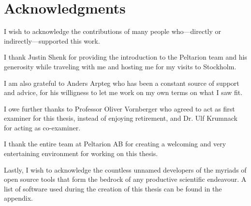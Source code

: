 \chapter*{Acknowledgments}

I wish to acknowledge the contributions of many people who---directly or
indirectly---supported this work.

I thank Justin Shenk for providing the introduction to the Peltarion team and his generosity while traveling with me and
hosting me for my visits to Stockholm.

I am also grateful to Anders Arpteg who has been a constant source of
support and advice, for his willigness to let me work on my own terms on
what I saw fit.

I owe further thanks to Professor Oliver Vornberger who agreed to act as first examiner for this thesis, instead of
enjoying retirement, and Dr. Ulf Krumnack for acting as co-examiner.

I thank the entire team at Peltarion AB for creating a welcoming and very entertaining environment for working on this
thesis.

Lastly, I wish to acknowledge the countless unnamed developers of the myriads of open source tools that form the bedrock
of any productive scientific endeavour. A list of software used during the creation of this thesis can be found in the
appendix.
